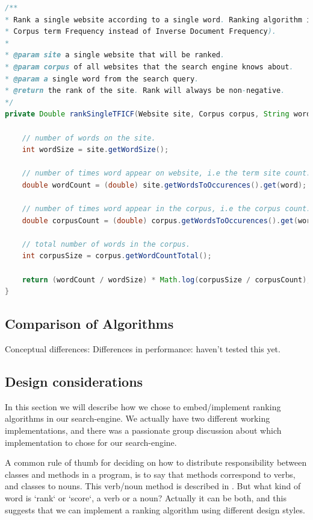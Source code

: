 \begin{lstlisting}[language=Java, caption=This is a code example., label=lst:TFICF]
  /**
* Rank a single website according to a single word. Ranking algorithm is TFICF (i.e Inverse
* Corpus term Frequency instead of Inverse Document Frequency).
* 
* @param site a single website that will be ranked.
* @param corpus of all websites that the search engine knows about.
* @param a single word from the search query.
* @return the rank of the site. Rank will always be non-negative.
*/
private Double rankSingleTFICF(Website site, Corpus corpus, String word) {

	// number of words on the site.
	int wordSize = site.getWordSize();
	
	// number of times word appear on website, i.e the term site count.
	double wordCount = (double) site.getWordsToOccurences().get(word);
	
	// number of times word appear in the corpus, i.e the corpus count.
	double corpusCount = (double) corpus.getWordsToOccurences().get(word);
	
	// total number of words in the corpus.
	int corpusSize = corpus.getWordCountTotal();
	
	return (wordCount / wordSize) * Math.log(corpusSize / corpusCount);
}
\end{lstlisting}




\subsection{Comparison of Algorithms}

Conceptual differences:
Differences in performance: haven't tested this yet.


\subsection{Design considerations}
In this section we will describe how we chose to embed/implement ranking algorithms in our search-engine. We actually have two different working implementations, and there was a passionate group discussion about which implementation to chose for our search-engine.  

A common rule of thumb for deciding on how to distribute responsibility between classes and methods in a program, is to say that methods correspond to verbs, and classes to nouns. This verb/noun method is described in \cite[p.530]{BK}.
But what kind of word is `rank` or `score`, a verb or a noun? Actually it can be both, and this suggests that we can implement a ranking algorithm using different design styles.

